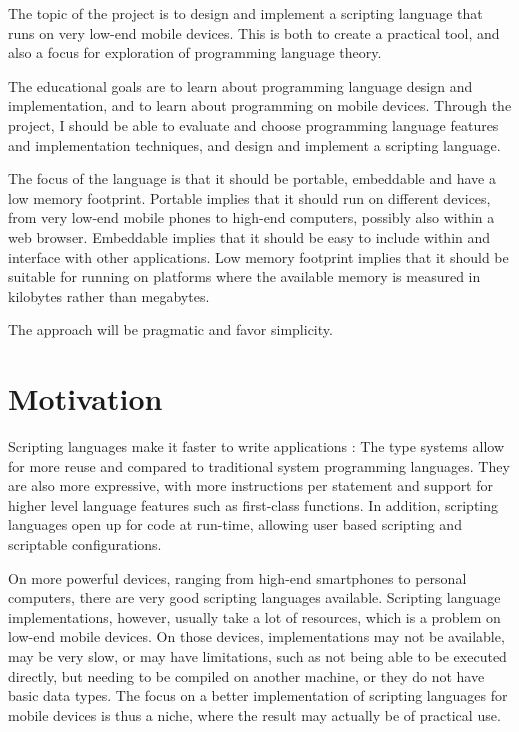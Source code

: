 \documentclass[11pt]{report}
\begin{document}
    The topic of the project is to design and implement a scripting language
that runs on very low-end mobile devices. This is both to create a practical tool, and
also a focus for exploration of programming language theory. 

\begin{comment}
The motivation is that a scripting language makes it is easier to make applications for mobile 
devices, and that existing freely available scripting languages
are very limited, slow, or simply does not run on the low-end mobile devices.
\end{comment}

    The educational goals are to learn about programming language design and
implementation, and to learn about programming on mobile devices. Through the
project, I should be able to evaluate and choose programming language features
and implementation techniques, and design and implement a scripting language.

    The focus of the language is that it should be portable, embeddable and have
a low memory footprint. Portable implies that it should run on different devices,
from very low-end mobile phones to high-end computers, possibly also within a web browser. 
Embeddable implies that it should be easy to include within and interface with
other applications. Low memory footprint implies that it should be suitable for
running on platforms where the available memory is measured in kilobytes rather
than megabytes. 

    The approach will be pragmatic and favor simplicity.

\section{Motivation}
Scripting languages make it faster to write applications \cite{scripting-ousterhout}:
The type systems allow for more reuse and compared to traditional system programming languages.
They are also more expressive, with more instructions per statement and support for higher level language features such as first-class functions.
In addition, scripting languages open up for code at run-time, allowing user based scripting and scriptable configurations.

On more powerful devices, ranging from high-end smartphones to personal computers, there are very good scripting languages available.
Scripting language implementations, however, usually take a lot of resources, which is a problem on low-end mobile devices. On those devices, implementations may not be available, may be very slow, or may have limitations, such as not being able to be executed directly, but needing to be compiled on another machine, or they do not have basic data types.
The focus on a better implementation of scripting languages for mobile devices is thus a niche, where the result may actually be of practical use.
\end{document}
